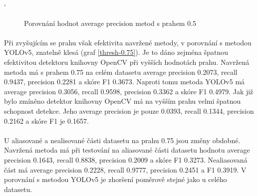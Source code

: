 `
\begin{figure}[h]
  \centering
  \caption{Porovnání hodnot average precision metod s prahem 0.5}
  \label{thresh-0.5}
\end{figure}
\pagebreak

\paragraph{} Při zvyšujícím se prahu však efektivita navržené metody, v porovnání s metodou YOLOv5, znatelně klesá (graf \ref{thresh-0.75}). Je to dáno zejména špatnou efektivitou detektoru knihovny OpenCV při vyšších hodnotách prahu. Navržená metoda má s prahem 0.75 na celém datasetu average precision 0.2073, recall 0.9437, precision 0.2281 a skóre F1 0.3673. Naproti tomu metoda YOLOv5 má average precision 0.3056, recall 0.9598, precision 0.3362 a skóre F1 0.4979. Jak již bylo zmíněno detektor knihovny OpenCV má na vyšším prahu velmi špatnou schopnost detekce. Jeho average precision je pouze 0.0393, recall 0.1344, precision 0.2162 a skóre F1 je 0.1657.


\paragraph{} U aliasované a nealisované části datasetu na prahu 0.75 jsou změny obdobné. Navržená metoda má při testování na aliasované části datasetu hodnotu average precision 0.1643, recall 0.8838, precision 0.2009 a skóre F1 0.3273. Nealiasovaná část má average precision 0.2228, recall 0.9777, precision 0.2451 a F1 0.3919. V porovnání s metodou YOLOv5 je zhoršení poměrově stejné jako u celého datasetu.


